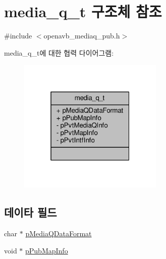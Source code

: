 \hypertarget{structmedia__q__t}{}\section{media\+\_\+q\+\_\+t 구조체 참조}
\label{structmedia__q__t}


{\ttfamily \#include $<$openavb\+\_\+mediaq\+\_\+pub.\+h$>$}



media\+\_\+q\+\_\+t에 대한 협력 다이어그램\+:
\nopagebreak
\begin{figure}[H]
\begin{center}
\leavevmode
\includegraphics[width=196pt]{structmedia__q__t__coll__graph}
\end{center}
\end{figure}
\subsection*{데이타 필드}
\begin{DoxyCompactItemize}
\item 
char $\ast$ \hyperlink{structmedia__q__t_a3f16216bd90b1b04cca7fbb4766cb5ff}{p\+Media\+Q\+Data\+Format}
\item 
void $\ast$ \hyperlink{structmedia__q__t_a0226ccb90fbafac84294a908013853b4}{p\+Pub\+Map\+Info}
\end{DoxyCompactItemize}
